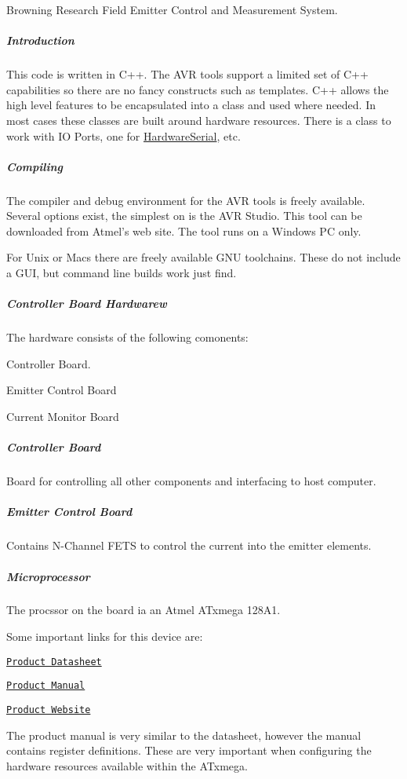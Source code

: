 Browning Research Field Emitter Control and Measurement System.\subparagraph*{Introduction }

This code is written in C++. The AVR tools support a limited set of C++ capabilities so there are no fancy constructs such as templates. C++ allows the high level features to be encapsulated into a class and used where needed. In most cases these classes are built around hardware resources. There is a class to work with IO Ports, one for \hyperlink{class_hardware_serial}{HardwareSerial}, etc.

\subparagraph*{Compiling }

The compiler and debug environment for the AVR tools is freely available. Several options exist, the simplest on is the AVR Studio. This tool can be downloaded from Atmel's web site. The tool runs on a Windows PC only.

For Unix or Macs there are freely available GNU toolchains. These do not include a GUI, but command line builds work just find.

\subparagraph*{Controller Board Hardwarew }

The hardware consists of the following comonents:


\begin{DoxyItemize}
\item Controller Board.  
\item Emitter Control Board 
\item Current Monitor Board 
\end{DoxyItemize}

\subparagraph*{Controller Board}

Board for controlling all other components and interfacing to host computer.

\subparagraph*{Emitter Control Board}

Contains N-\/Channel FETS to control the current into the emitter elements.

\subparagraph*{Microprocessor}

The procssor on the board ia an Atmel ATxmega 128A1.

Some important links for this device are:


\begin{DoxyItemize}
\item \href{http://www.atmel.com/dyn/resources/prod_documents/doc8067.pdf}{\tt Product Datasheet} 
\item \href{http://www.atmel.com/dyn/resources/prod_documents/doc8077.pdf}{\tt Product Manual} 
\item \href{http://www.atmel.com/dyn/products/product_card.asp?part_id=4298&category_id=163&family_id=607&subfamily_id=1965}{\tt Product Website} 
\end{DoxyItemize}

The product manual is very similar to the datasheet, however the manual contains register definitions. These are very important when configuring the hardware resources available within the ATxmega. 